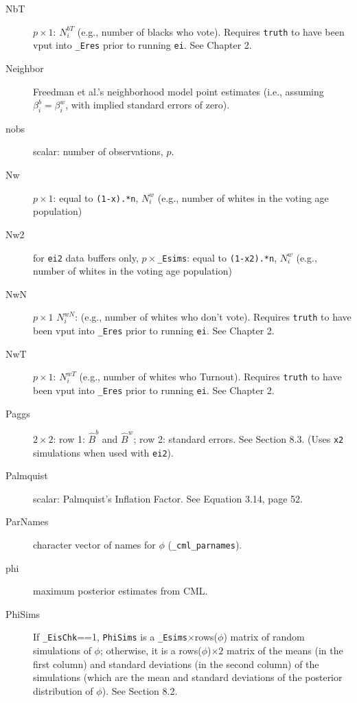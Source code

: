 \documentclass[11pt,titlepage]{article}
\newcommand{\NwN}{{N_i^{wN}}}
\newcommand{\Nwp}{{N_i^{w}}}
\newcommand{\NbV}{{N_i^{bT}}}       %
\newcommand{\NwV}{{N_i^{wT}}}
\begin{document}
\begin{description}
\item[NbT] $p\times1$: $\NbV$ (e.g., number of blacks who vote).
  Requires \texttt{truth} to have been vput into \texttt{\_Eres} prior
  to running \texttt{ei}. See Chapter 2.

\item[Neighbor] Freedman et al.'s neighborhood model point estimates
  (i.e., assuming $\beta_i^b=\beta_i^w$, with implied standard errors
  of zero).

\item[nobs] scalar: number of observations, $p$.

\item[Nw] $p\times 1$: equal to \texttt{(1-x).*n}, $\Nwp$ (e.g.,
  number of whites in the voting age population)

\item[Nw2] for \texttt{ei2} data buffers only,
  $p\times$\texttt{\_Esims}: equal to \texttt{(1-x2).*n}, $\Nwp$
  (e.g., number of whites in the voting age population)

\item[NwN] $p\times1$ $\NwN$: (e.g., number of whites who don't vote).
  Requires \texttt{truth} to have been vput into \texttt{\_Eres} prior
  to running \texttt{ei}.  See Chapter 2.

\item[NwT] $p\times1$: $\NwV$ (e.g., number of whites who Turnout).
  Requires \texttt{truth} to have been vput into \texttt{\_Eres} prior
  to running \texttt{ei}. See Chapter 2.

\item[Paggs] $2\times 2$: row 1: $\hat{B}^b$ and $\hat{B}^w$; row 2:
  standard errors.  See Section 8.3.  (Uses \texttt{x2}
  simulations when used with \texttt{ei2}).

\item[Palmquist] scalar: Palmquist's Inflation Factor.  See Equation
  3.14, page 52.

\item[ParNames] character vector of names for $\phi$
  (\texttt{\_cml\_parnames}).

\item[phi] maximum posterior estimates from CML.

\item[PhiSims] If \texttt{\_EisChk}==1, \texttt{PhiSims} is a
  \texttt{\_Esims}$\times$rows($\phi$) matrix of random simulations of
  $\phi$; otherwise, it is a rows($\phi$)$\times 2$ matrix of the
  means (in the first column) and standard deviations (in the second
  column) of the simulations (which are the mean and standard
  deviations of the posterior distribution of $\phi$).  See Section
  8.2.


\end{description}
\end{document}
